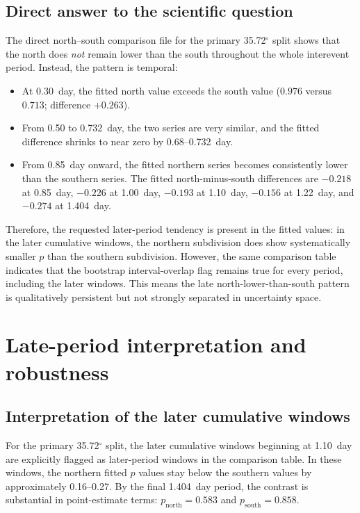 \documentclass[11pt]{article}
\begin{document}
\subsection{Direct answer to the scientific question}
The direct north--south comparison file for the primary 35.72$^{\circ}$ split shows that the north does \emph{not} remain lower than the south throughout the whole interevent period. Instead, the pattern is temporal:
\begin{itemize}[leftmargin=2em]
    \item At 0.30~day, the fitted north value exceeds the south value ($0.976$ versus $0.713$; difference $+0.263$).
    \item From 0.50 to 0.732~day, the two series are very similar, and the fitted difference shrinks to near zero by 0.68--0.732~day.
    \item From 0.85~day onward, the fitted northern series becomes consistently lower than the southern series. The fitted north-minus-south differences are $-0.218$ at 0.85~day, $-0.226$ at 1.00~day, $-0.193$ at 1.10~day, $-0.156$ at 1.22~day, and $-0.274$ at 1.404~day.
\end{itemize}

Therefore, the requested later-period tendency is present in the fitted values: in the later cumulative windows, the northern subdivision does show systematically smaller $p$ than the southern subdivision. However, the same comparison table indicates that the bootstrap interval-overlap flag remains true for every period, including the later windows. This means the late north-lower-than-south pattern is qualitatively persistent but not strongly separated in uncertainty space.

\section{Late-period interpretation and robustness}
\subsection{Interpretation of the later cumulative windows}
For the primary 35.72$^{\circ}$ split, the later cumulative windows beginning at 1.10~day are explicitly flagged as later-period windows in the comparison table. In these windows, the northern fitted $p$ values stay below the southern values by approximately 0.16--0.27. By the final 1.404~day period, the contrast is substantial in point-estimate terms: $p_{\mathrm{north}}=0.583$ and $p_{\mathrm{south}}=0.858$.
\end{document}
